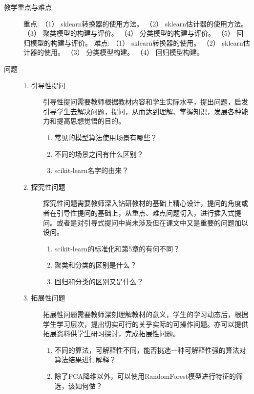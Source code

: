 \documentclass[12pt,a4paper,openany,cap]{ctexbook}
\begin{document}
\begin{description}
\item[教学重点与难点]    重点:
    （1） sklearn转换器的使用方法。
    （2） sklearn估计器的使用方法。
    （3） 聚类模型的构建与评价。
    （4） 分类模型的构建与评价。
    （5） 回归模型的构建与评价。
 难点:
    （1） sklearn转换器的使用。
    （2） sklearn估计器的使用。
    （3） 分类模型构建。
    （4） 回归模型构建。
\item[问题]
  \begin{minipage}[t]{0.8\linewidth}
    \begin{description}
    \item[1. 引导性提问]             
引导性提问需要教师根据教材内容和学生实际水平，提出问题，启发引导学生去解决问题，提问，从而达到理解、掌握知识，发展各种能力和提高思想觉悟的目的。
\begin{enumerate}
\item     常见的模型算法使用场景有哪些？
\item\label{item:176}  不同的场景之间有什么区别？
\item\label{item:177}  scikit-learn名字的由来？
\end{enumerate}
\item[2. 探究性问题]
探究性问题需要教师深入钻研教材的基础上精心设计，提问的角度或者在引导性提问的基础上，从重点、难点问题切入，进行插入式提问。或者是对引导式提问中尚未涉及但在课文中又是重要的问题加以设问。
\begin{enumerate}
\item     scikit-learn的标准化和第5章的有何不同？
\item\label{item:178}  聚类和分类的区别是什么？
\item\label{item:179}  回归和分类的区别又是什么？
\end{enumerate}
\item[3. 拓展性问题]
拓展性问题需要教师深刻理解教材的意义，学生的学习动态后，根据学生学习层次，提出切实可行的关乎实际的可操作问题。亦可以提供拓展资料供学生研习探讨，完成拓展性问题。
\begin{enumerate}
\item     不同的算法，可解释性不同，能否挑选一种可解释性强的算法对算法结果进行解释？
\item\label{item:180}  除了PCA降维以外，可以使用RandomForest模型进行特征的筛选，该如何做？ 
\end{enumerate}
    \end{description}
  \end{minipage}


\end{description}
\end{document}
